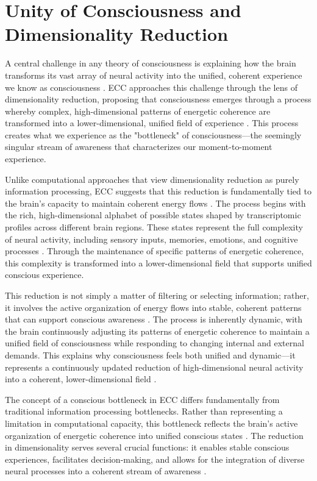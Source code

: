 \section{Unity of Consciousness and Dimensionality Reduction}

A central challenge in any theory of consciousness is explaining how the brain transforms its vast array of neural activity into the unified, coherent experience we know as consciousness \cite{tononi2016integrated}. ECC approaches this challenge through the lens of dimensionality reduction, proposing that consciousness emerges through a process whereby complex, high-dimensional patterns of energetic coherence are transformed into a lower-dimensional, unified field of experience \cite{baars2002conscious}. This process creates what we experience as the "bottleneck" of consciousness—the seemingly singular stream of awareness that characterizes our moment-to-moment experience.

Unlike computational approaches that view dimensionality reduction as purely information processing, ECC suggests that this reduction is fundamentally tied to the brain's capacity to maintain coherent energy flows \cite{dehaene2011experimental}. The process begins with the rich, high-dimensional alphabet of possible states shaped by transcriptomic profiles across different brain regions. These states represent the full complexity of neural activity, including sensory inputs, memories, emotions, and cognitive processes \cite{bayne2010unity}. Through the maintenance of specific patterns of energetic coherence, this complexity is transformed into a lower-dimensional field that supports unified conscious experience.

This reduction is not simply a matter of filtering or selecting information; rather, it involves the active organization of energy flows into stable, coherent patterns that can support conscious awareness \cite{mashour2020conscious}. The process is inherently dynamic, with the brain continuously adjusting its patterns of energetic coherence to maintain a unified field of consciousness while responding to changing internal and external demands. This explains why consciousness feels both unified and dynamic—it represents a continuously updated reduction of high-dimensional neural activity into a coherent, lower-dimensional field \cite{carhart2014entropic}.

The concept of a conscious bottleneck in ECC differs fundamentally from traditional information processing bottlenecks. Rather than representing a limitation in computational capacity, this bottleneck reflects the brain's active organization of energetic coherence into unified conscious states \cite{bayne2003what}. The reduction in dimensionality serves several crucial functions: it enables stable conscious experiences, facilitates decision-making, and allows for the integration of diverse neural processes into a coherent stream of awareness \cite{dainton2006stream}.

